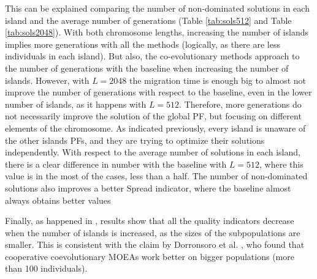 \documentclass[Crown,sagev,times,doublespace]{sagej}
\begin{document}
This can be explained comparing the number of non-dominated solutions in each island and the average number of generations (Table \ref{tab:sols512} and Table \ref{tab:sols2048}). With both chromosome lengths, increasing the number of islands implies more generations with all the methods (logically, as there are less individuals in each island). But also, the co-evolutionary methods approach to the number of generations with the baseline when increasing the number of islands. However, with $L=2048$ the migration time is enough big to almost not improve the number of generations with respect to the baseline, even in the lower number of islands, as it happens with $L=512$. Therefore, more generations do not necessarily improve the solution of the global PF, but focusing on different elements of the chromosome. As indicated previously, every island is unaware of the other islands PFs, and they are trying to optimize their solutions independently. With respect to the average number of solutions in each island, there is a clear difference in number with the baseline with $L=512$, where this value is in the most of the cases, less than a half. The number of non-dominated solutions also improves a better Spread indicator, where the baseline almost always obtains better values %

Finally, as happened in \citep{Garcia16hpmoonANONYMOUS}, results show that all the quality indicators decrease when the number of islands is increased, as the  sizes of the subpopulations are smaller. This is consistent with the claim by Dorronsoro et al. \citep{Dorronsoro13superlinear}, who found that cooperative coevolutionary MOEAs work better on bigger populations (more than 100 individuals).





%
\end{document}
